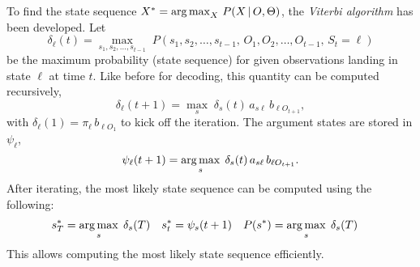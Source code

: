 			To find the state sequence \(X^\ast = \operatorname*{arg\,max}_X \, P(X \,\vert\, O, \Theta) \), the \emph{Viterbi algorithm} has been developed. Let
			\begin{equation}
				\delta_\ell(t) = \max_{s_1, s_2, \dots, s_{t - 1}} \; P(s_1, s_2, \dots, s_{t - 1},\, O_1, O_2, \dots, O_{t - 1},\, S_t = \ell)
			\end{equation}
			be the maximum probability (state sequence) for given observations landing in state \(\ell\) at time \(t\). Like before for decoding, this quantity can be computed recursively,
			\begin{equation}
				\delta_\ell(t + 1) = \max_s \; \delta_s(t) \, a_{s \ell} \, b_{\ell O_{t + 1}},
			\end{equation}
			with \( \delta_\ell(1) = \pi_\ell \, b_{\ell O_1} \) to kick off the iteration. The argument states are stored in \( \psi_\ell \),
			\begin{equation}
				\psi_\ell(t + 1) = \operatorname*{arg\,max}_s \; \delta_s(t) \, a_{s \ell} \, b_{\ell O_{t + 1}}.
			\end{equation}
			After iterating, the most likely state sequence can be computed using the following:
			\begin{align}
				s_T^\ast  & = \operatorname*{arg\,max}_s \; \delta_s(T) &
				s_t^\ast  & = \psi_s(t + 1)            &
				P(s^\ast) & = \operatorname*{arg\,max}_s \; \delta_s(T)
			\end{align}
			This allows computing the most likely state sequence efficiently.

